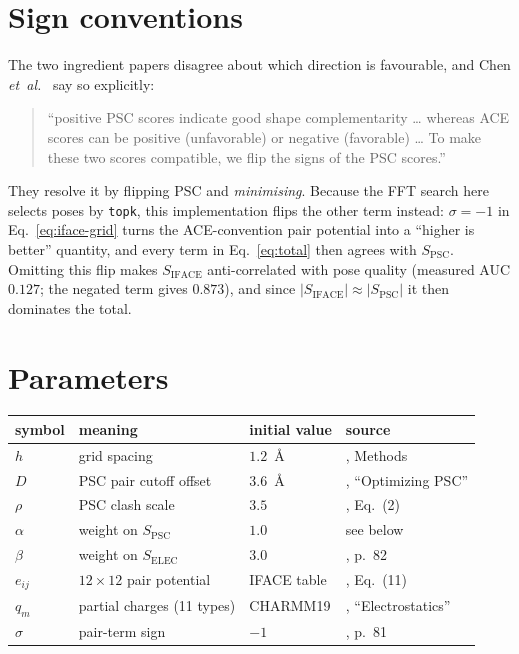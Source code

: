\documentclass[11pt,a4paper]{article}
\newcommand{\Spsc}{S_{\mathrm{PSC}}}
\newcommand{\Siface}{S_{\mathrm{IFACE}}}
\newcommand{\Selec}{S_{\mathrm{ELEC}}}
\begin{document}
\section{Sign conventions}
\label{sec:signs}

The two ingredient papers disagree about which direction is favourable, and
Chen \emph{et~al.}~\cite{Chen2003zdock} say so explicitly:

\begin{quote}\small
``positive PSC scores indicate good shape complementarity \ldots{} whereas ACE
scores can be positive (unfavorable) or negative (favorable) \ldots{} To make
these two scores compatible, we flip the signs of the PSC scores.''
\end{quote}

They resolve it by flipping PSC and \emph{minimising}. Because the FFT search
here selects poses by \texttt{topk}, this implementation flips the other term
instead: $\sigma=-1$ in Eq.~\eqref{eq:iface-grid} turns the ACE-convention pair
potential into a ``higher is better'' quantity, and every term in
Eq.~\eqref{eq:total} then agrees with $\Spsc$. Omitting this flip makes
$\Siface$ anti-correlated with pose quality (measured AUC $0.127$; the negated
term gives $0.873$), and since $\lvert\Siface\rvert \approx \lvert\Spsc\rvert$
it then dominates the total.

\section{Parameters}

\begin{center}
\begin{tabular}{llll}
  \toprule
  symbol & meaning & initial value & source \\
  \midrule
  $h$        & grid spacing              & $1.2$~\AA  & \cite{ChenWeng2003psc}, Methods \\
  $D$        & PSC pair cutoff offset    & $3.6$~\AA  & \cite{ChenWeng2003psc}, ``Optimizing PSC'' \\
  $\rho$     & PSC clash scale           & $3.5$      & \cite{Chen2003zdock}, Eq.~(2) \\
  $\alpha$   & weight on $\Spsc$         & $1.0$      & see below \\
  $\beta$    & weight on $\Selec$        & $3.0$      & \cite{Chen2003zdock}, p.~82 \\
  $e_{ij}$   & $12\times12$ pair potential & IFACE table & \cite{Mintseris2007}, Eq.~(11) \\
  $q_m$      & partial charges (11 types) & CHARMM19 & \cite{ChenWeng2002}, ``Electrostatics'' \\
  $\sigma$   & pair-term sign            & $-1$       & \cite{Chen2003zdock}, p.~81 \\
  \bottomrule
\end{tabular}
\end{center}
\end{document}
